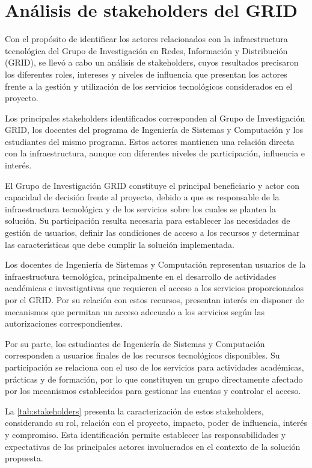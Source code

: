 \section{Análisis de stakeholders del \texorpdfstring{\ac{GRID}}{GRID}}

Con el propósito de identificar los actores relacionados con la infraestructura tecnológica del Grupo de Investigación en Redes, Información y Distribución (\ac{GRID}), se llevó a cabo un análisis de stakeholders, cuyos resultados precisaron los diferentes roles, intereses y niveles de influencia que presentan los actores frente a la gestión y utilización de los servicios tecnológicos considerados en el proyecto.

Los principales stakeholders identificados corresponden al Grupo de Investigación \ac{GRID}, los docentes del programa de Ingeniería de Sistemas y Computación y los estudiantes del mismo programa. Estos actores mantienen una relación directa con la infraestructura, aunque con diferentes niveles de participación, influencia e interés.

El Grupo de Investigación \ac{GRID} constituye el principal beneficiario y actor con capacidad de decisión frente al proyecto, debido a que es responsable de la infraestructura tecnológica y de los servicios sobre los cuales se plantea la solución. Su participación resulta necesaria para establecer las necesidades de gestión de usuarios, definir las condiciones de acceso a los recursos y determinar las características que debe cumplir la solución implementada.

Los docentes de Ingeniería de Sistemas y Computación representan usuarios de la infraestructura tecnológica, principalmente en el desarrollo de actividades académicas e investigativas que requieren el acceso a los servicios proporcionados por el \ac{GRID}. Por su relación con estos recursos, presentan interés en disponer de mecanismos que permitan un acceso adecuado a los servicios según las autorizaciones correspondientes.

Por su parte, los estudiantes de Ingeniería de Sistemas y Computación corresponden a usuarios finales de los recursos tecnológicos disponibles. Su participación se relaciona con el uso de los servicios para actividades académicas, prácticas y de formación, por lo que constituyen un grupo directamente afectado por los mecanismos establecidos para gestionar las cuentas y controlar el acceso.

La \autoref{tab:stakeholders} presenta la caracterización de estos stakeholders, considerando su rol, relación con el proyecto, impacto, poder de influencia, interés y compromiso. Esta identificación permite establecer las responsabilidades y expectativas de los principales actores involucrados en el contexto de la solución propuesta.


